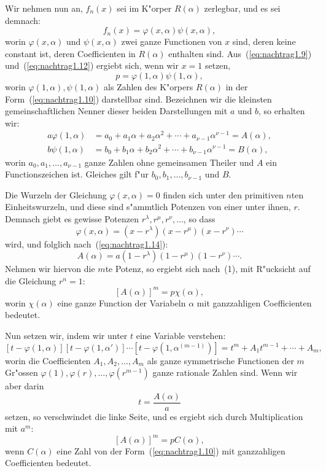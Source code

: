 \documentclass[10pt,a4paper]{article}
\theoremstyle{weberstyle}
\begin{document}
Wir nehmen nun an, $f_n(x)$ sei im K"orper $R(\alpha)$ zerlegbar, und es
sei demnach:
\begin{equation}\label{eq:nachtrag1.12}
f_n(x) = \varphi(x,\alpha)\psi(x,\alpha),
\end{equation}
worin $\varphi(x,\alpha)$ und $\psi(x,\alpha)$ zwei ganze Functionen von $x$
sind, deren keine constant ist, deren Coefficienten in $R(\alpha)$
enthalten sind. Aus~(\ref{eq:nachtrag1.9}) und~(\ref{eq:nachtrag1.12})
ergiebt sich, wenn wir $x=1$ setzen,
\begin{equation}\label{eq:nachtrag1.13}
p = \varphi(1,\alpha)\psi(1,\alpha),
\end{equation}
worin $\varphi(1,\alpha),\psi(1,\alpha)$ als Zahlen des K"orpers $R(\alpha)$ in
der Form~(\ref{eq:nachtrag1.10}) darstellbar sind. Bezeichnen wir die
kleinsten gemeinschaftlichen Nenner dieser beiden Darstellungen mit $a$
und $b$, so erhalten wir:
\begin{align}
a\varphi(1,\alpha) &= a_0+a_1\alpha+a_2\alpha^2+\cdots+a_{\nu-1}\alpha^{\nu-1}
= A(\alpha),\label{eq:nachtrag1.14}\\
b\psi(1,\alpha) &= b_0+b_1\alpha+b_2\alpha^2+\cdots+b_{\nu-1}\alpha^{\nu-1}
= B(\alpha),\label{eq:nachtrag1.15}
\end{align}
worin $a_0,a_1,\dots,a_{\nu-1}$ ganze Zahlen ohne gemeinsamen Theiler und
$A$ ein Functionszeichen ist. Gleiches gilt f"ur $b_0,b_1,\dots,b_{\nu-1}$
und $B$.

Die Wurzeln der Gleichung $\varphi(x,\alpha)=0$ finden sich unter den
primitiven $n$ten Einheitswurzeln, und diese sind s"ammtlich Potenzen von
einer unter ihnen, $r$. Demnach giebt es gewisse Potenzen
$r^\lambda,r^\mu,r^\nu,\dots$, so dass
\[
\varphi(x,\alpha) = (x-r^\lambda)(x-r^\mu)(x-r^\nu)\cdots
\]
wird, und folglich nach~(\ref{eq:nachtrag1.14}):
\[
A(\alpha) = a(1-r^\lambda)(1-r^\mu)(1-r^\nu)\cdots.
\]
Nehmen wir hiervon die $m$te Potenz, so ergiebt sich nach~(1), mit
R"ucksicht auf die Gleichung $r^n=1$:
\[
[A(\alpha)]^m = p\chi(\alpha),
\]
worin $\chi(\alpha)$ eine ganze Function der Variabeln $\alpha$ mit
ganzzahligen Coefficienten bedeutet.

Nun setzen wir, indem wir unter $t$ eine Variable verstehen:
\[
[t-\varphi(1,\alpha)][t-\varphi(1,\alpha')]
\cdots[t-\varphi(1,\alpha^{(m-1)})] =
t^m + A_1t^{m-1} + \cdots + A_m,
\]
worin die Coefficienten $A_1,A_2,\dots,A_m$ als ganze symmetrische
Functionen der $m$ Gr"ossen $\varphi(1),\varphi(r),\dots,\varphi(r^{m-1})$
ganze rationale Zahlen sind. Wenn wir aber darin
\[
t = \frac{A(\alpha)}{a}
\]
setzen, so verschwindet die linke Seite, und es ergiebt sich durch
Multiplication mit $a^m$:
\begin{equation}\label{eq:nachtrag1.16}
[A(\alpha)]^m = pC(\alpha),
\end{equation}
wenn $C(\alpha)$ eine Zahl von der Form~(\ref{eq:nachtrag1.10}) mit
ganzzahligen Coefficienten bedeutet.
\end{document}
